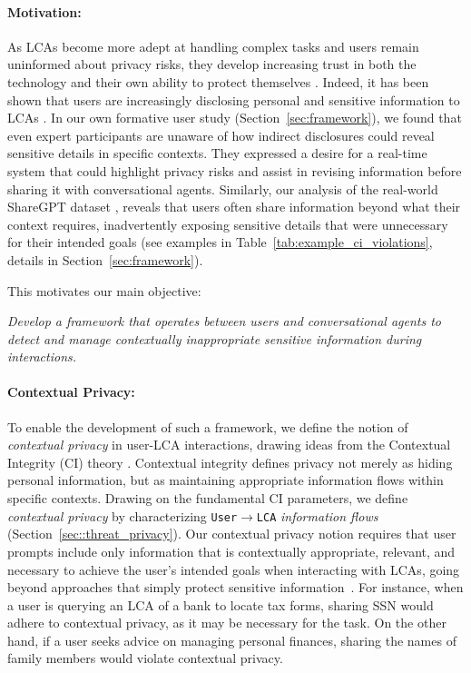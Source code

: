 \paragraph{Motivation:} 
As LCAs become more adept at handling complex tasks and users remain uninformed about privacy risks, they develop increasing trust in both the technology and their own ability to protect themselves \citep{natarajan2020effects,cummings2023challenges}. 
Indeed, it has been shown that users are increasingly disclosing personal and sensitive information to LCAs \citep{zhang2024s, mireshghallah2024trust}.
In our own formative user study (Section~\ref{sec:framework}), we found that even expert participants are unaware of how indirect disclosures could reveal sensitive details in specific contexts.
They expressed a desire for a real-time system that could highlight privacy risks and assist in revising information before sharing it with conversational agents. Similarly, our analysis of the real-world ShareGPT dataset \citep{vicuna2023}, reveals that users often share information beyond what their context requires, inadvertently exposing sensitive details that were unnecessary for their intended goals (see examples in  Table~\ref{tab:example_ci_violations}, details in Section~\ref{sec:framework}). 


This motivates our main objective: %
\begin{center}
    \emph{Develop a framework that operates between users and conversational agents to detect and manage contextually inappropriate sensitive information during interactions.}
\end{center}


\paragraph{Contextual Privacy:} To enable the development of such a framework, we define the notion of \textit{contextual privacy} in user-LCA interactions, drawing ideas from the Contextual Integrity (CI) theory \citep{nissenbaum2004privacy, nissenbaum2011privacy}. Contextual integrity defines privacy not merely as hiding personal information, but as maintaining appropriate information flows within specific contexts. Drawing on the fundamental CI parameters, we define \textit{contextual privacy} by characterizing \texttt{User}$\rightarrow$\texttt{LCA} \textit{information flows} (Section~\ref{sec::threat_privacy}). Our contextual privacy notion requires that user prompts include only information that is contextually appropriate, relevant, and necessary to achieve the user's intended goals when interacting with LCAs, going beyond approaches that simply protect sensitive information~\citep{dou2023reducing,siyan2024papillon}. 
For instance, when a user is querying an LCA of a bank to locate tax forms, sharing SSN would adhere to contextual privacy, as it may be necessary for the task. On the other hand, if a user seeks advice on managing personal finances, sharing the names of family members would violate contextual privacy.





